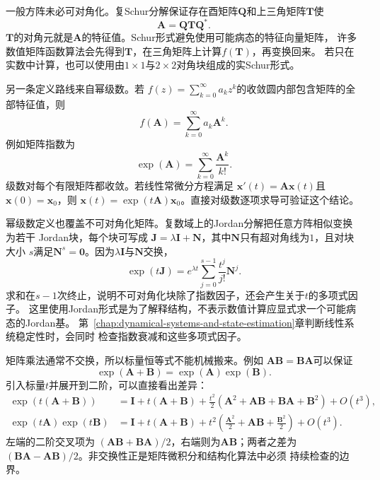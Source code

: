 一般方阵未必可对角化。复Schur分解保证存在酉矩阵$\bm{Q}$和上三角矩阵$\bm{T}$使
\begin{equation}
  \bm{A}=\bm{Q}\bm{T}\bm{Q}^{*}.
  \label{eq:matrix-analysis-schur-decomposition}
\end{equation}
$\bm{T}$的对角元就是$\bm{A}$的特征值。Schur形式避免使用可能病态的特征向量矩阵，
许多数值矩阵函数算法会先得到$\bm{T}$，在三角矩阵上计算$f(\bm{T})$，再变换回来。
若只在实数中计算，也可以使用由$1\times1$与$2\times2$对角块组成的实Schur形式。

另一条定义路线来自幂级数。若
$f(z)=\sum_{k=0}^{\infty}a_kz^k$的收敛圆内部包含矩阵的全部特征值，则
\[
  f(\bm{A})=\sum_{k=0}^{\infty}a_k\bm{A}^k.
\]
例如矩阵指数为
\begin{equation}
  \exp(\bm{A})=\sum_{k=0}^{\infty}\frac{\bm{A}^k}{k!}.
  \label{eq:matrix-analysis-matrix-exponential}
\end{equation}
级数对每个有限矩阵都收敛。若线性常微分方程满足
$\bm{x}'(t)=\bm{A}\bm{x}(t)$且$\bm{x}(0)=\bm{x}_0$，则
$\bm{x}(t)=\exp(t\bm{A})\bm{x}_0$。直接对级数逐项求导可验证这个结论。

幂级数定义也覆盖不可对角化矩阵。复数域上的Jordan分解把任意方阵相似变换为若干
Jordan块，每个块可写成
$\bm{J}=\lambda\bm{I}+\bm{N}$，其中$\bm{N}$只有超对角线为$1$，且对块大小
$s$满足$\bm{N}^{s}=\bm{0}$。因为$\lambda\bm{I}$与$\bm{N}$交换，
\[
  \exp(t\bm{J})
  =e^{\lambda t}
    \sum_{j=0}^{s-1}\frac{t^j}{j!}\bm{N}^j.
\]
求和在$s-1$次终止，说明不可对角化块除了指数因子，还会产生关于$t$的多项式因子。
这里使用Jordan形式是为了解释结构，不表示数值计算应显式求一个可能病态的Jordan基。
第~\ref{chap:dynamical-systems-and-state-estimation}章判断线性系统稳定性时，会同时
检查指数衰减和这些多项式因子。

矩阵乘法通常不交换，所以标量恒等式不能机械搬来。例如
$\bm{A}\bm{B}=\bm{B}\bm{A}$可以保证
\[
  \exp(\bm{A}+\bm{B})=\exp(\bm{A})\exp(\bm{B}).
\]
引入标量$t$并展开到二阶，可以直接看出差异：
\begin{align*}
  \exp(t(\bm{A}+\bm{B}))
  &=
  \bm{I}+t(\bm{A}+\bm{B})
  +\frac{t^2}{2}
   (\bm{A}^2+\bm{A}\bm{B}+\bm{B}\bm{A}+\bm{B}^2)
  +O(t^3),\\
  \exp(t\bm{A})\exp(t\bm{B})
  &=
  \bm{I}+t(\bm{A}+\bm{B})
  +t^2\left(
    \frac{\bm{A}^2}{2}+\bm{A}\bm{B}+\frac{\bm{B}^2}{2}
  \right)
  +O(t^3).
\end{align*}
左端的二阶交叉项为
$(\bm{A}\bm{B}+\bm{B}\bm{A})/2$，右端则为$\bm{A}\bm{B}$；两者之差为
$(\bm{B}\bm{A}-\bm{A}\bm{B})/2$。非交换性正是矩阵微积分和结构化算法中必须
持续检查的边界。

